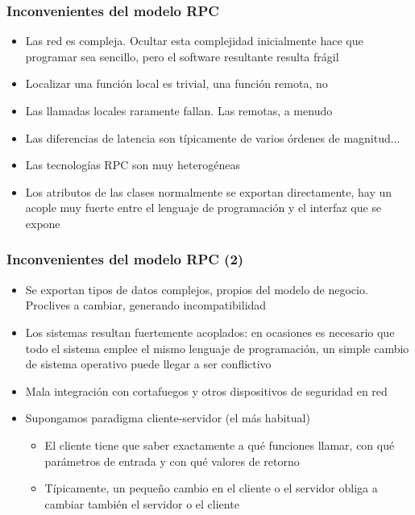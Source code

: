 \documentclass[ucs]{beamer}
\begin{document}
\begin{frame}[fragile]
\frametitle{Inconvenientes del modelo RPC}
\begin{itemize}
\item
Las red es compleja. Ocultar esta complejidad inicialmente hace que programar sea sencillo,
pero el software resultante resulta frágil
\item
Localizar una función local
es trivial, una función remota, no
\item
Las llamadas locales raramente fallan. Las remotas, a menudo
\item
Las diferencias de latencia son típicamente de varios órdenes de magnitud...
\item
Las tecnologías RPC son muy heterogéneas

\item
Los atributos de las clases normalmente se exportan
directamente, hay un acople muy fuerte entre el lenguaje de programación
y el interfaz que se expone

\end{itemize}
\end{frame}
\begin{frame}[fragile]
\frametitle{Inconvenientes del modelo RPC (2)}
\begin{itemize}
\item
Se exportan tipos de datos complejos, propios del modelo de negocio. Proclives a cambiar, generando
incompatibilidad
\item
Los sistemas resultan fuertemente acoplados: en ocasiones es necesario que todo el sistema
emplee el mismo lenguaje de programación, un simple cambio de sistema operativo
puede llegar a ser conflictivo
\item
Mala integración con cortafuegos y otros dispositivos de seguridad en red
\item

Supongamos paradigma cliente-servidor (el más habitual)

\begin{itemize}
\item
El cliente tiene que saber exactamente a qué funciones llamar, con qué parámetros
de entrada y con qué valores de retorno
\item
Típicamente, un pequeño cambio en el cliente o el servidor obliga a cambiar también
el servidor o el cliente
\end{itemize}

\end{itemize}
\end{frame}
\end{document}
